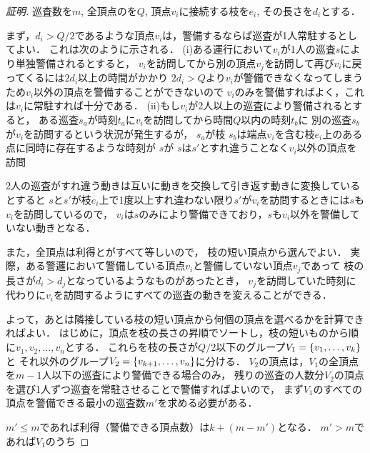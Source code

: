 \begin{proof}[証明]

    巡査数を$m$, 全頂点の{\timelimit}を$Q$, 頂点$v_i$に接続する枝を$e_i$, その長さを$d_i$とする．

    まず，$d_i > Q/2$であるような頂点$v_i$は，警備するならば巡査が1人常駐するとしてよい．
    これは次のように示される．
    (i)ある運行において$v_i$が1人の巡査$s$により単独警備されるとすると，
    $v_i$を訪問してから別の頂点$v_j$を訪問して再び$v_i$に戻ってくるには$2d_i$以上の時間がかかり
    $2d_i > Q$より$v_i$が警備できなくなってしまうため$v_i$以外の頂点を警備することができないので
    $v_i$のみを警備すればよく，これは$v_i$に常駐すれば十分である．
    (ii)もし$v_i$が2人以上の巡査により警備されるとすると，
    ある巡査$s_a$が時刻$t_a$に$v_i$を訪問してから時間$Q$以内の時刻$t_b$に
    別の巡査$s_b$が$v_i$を訪問するという状況が発生するが，
    $s_a$が枝
    $s_b$は端点$v_i$を含む枝$e_i$上のある点に同時に存在するような時刻が
    $s$が
    $s$は$s'$とすれ違うことなく$v_i$以外の頂点を訪問



    2人の巡査がすれ違う動きは互いに動きを交換して引き返す動きに変換しているとすると
    $s$と$s'$が枝$e_i$上で1度以上すれ違わない限り$s'$が$v_i$を訪問するときには$s$も
    $v_i$を訪問しているので，
    $v_i$は$s$のみにより警備できており，$s$も$v_i$以外を警備していない動きとなる．


    また，全頂点は利得と{\timelimit}がすべて等しいので，
    枝の短い頂点から選んでよい．
    実際，ある警邏において警備している頂点$v_i$と警備していない頂点$v_j$であって
    枝の長さが$d_i > d_j$となっているようなものがあったとき，
    $v_j$を訪問していた時刻に代わりに$v_i$を訪問するようにすべての巡査の動きを変えることができる．


    よって，あとは隣接している枝の短い頂点から何個の頂点を選べるかを計算できればよい．
    はじめに，頂点を枝の長さの昇順でソートし，枝の短いものから順に$v_1,v_2, \ldots, v_n$とする．
    これらを枝の長さが$Q/2$以下のグループ$V_1 = \left\{{v_1, \ldots, v_k}\right\}$と
    それ以外のグループ$V_2 = \left\{{ v_{k + 1}, \ldots, v_n }\right\}$に分ける．
    $V_2$の頂点は，$V_1$の全頂点を$m - 1$人以下の巡査により警備できる場合のみ，
    残りの巡査の人数分$V_2$の頂点を選び1人ずつ巡査を常駐させることで警備すればよいので，
    まず$V_1$のすべての頂点を警備できる最小の巡査数$m'$を求める必要がある．

    $m' \leq m$であれば利得（警備できる頂点数）は$k + (m - m')$となる．
    $m' > m$であれば$V_1$のうち

\end{proof}












